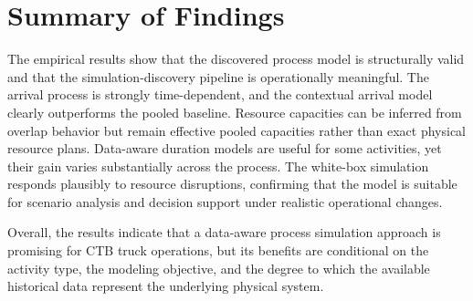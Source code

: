 \section{Summary of Findings}
\label{sec:results_summary}

The empirical results show that the discovered process model is structurally valid and that the simulation-discovery pipeline is operationally meaningful. The arrival process is strongly time-dependent, and the contextual arrival model clearly outperforms the pooled baseline. Resource capacities can be inferred from overlap behavior but remain effective pooled capacities rather than exact physical resource plans. Data-aware duration models are useful for some activities, yet their gain varies substantially across the process. The white-box simulation responds plausibly to resource disruptions, confirming that the model is suitable for scenario analysis and decision support under realistic operational changes.

Overall, the results indicate that a data-aware process simulation approach is promising for CTB truck operations, but its benefits are conditional on the activity type, the modeling objective, and the degree to which the available historical data represent the underlying physical system.

